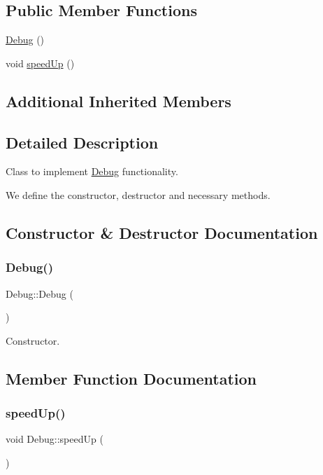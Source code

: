 \subsection*{Public Member Functions}
\begin{DoxyCompactItemize}
\item 
\hyperlink{classDebug_a5b453c195c4cfffed2702c3330f53a64}{Debug} ()
\item 
void \hyperlink{classDebug_a4c42705f755444daa2a22b000a561e01}{speed\+Up} ()
\end{DoxyCompactItemize}
\subsection*{Additional Inherited Members}


\subsection{Detailed Description}
Class to implement \hyperlink{classDebug}{Debug} functionality. 

We define the constructor, destructor and necessary methods. 

\subsection{Constructor \& Destructor Documentation}
\mbox{\label{classDebug_a5b453c195c4cfffed2702c3330f53a64}} 
\subsubsection{\texorpdfstring{Debug()}{Debug()}}
{\footnotesize\ttfamily Debug\+::\+Debug (\begin{DoxyParamCaption}{ }\end{DoxyParamCaption})}

Constructor. 

\subsection{Member Function Documentation}
\mbox{\label{classDebug_a4c42705f755444daa2a22b000a561e01}} 
\subsubsection{\texorpdfstring{speed\+Up()}{speedUp()}}
{\footnotesize\ttfamily void Debug\+::speed\+Up (\begin{DoxyParamCaption}{ }\end{DoxyParamCaption})}

